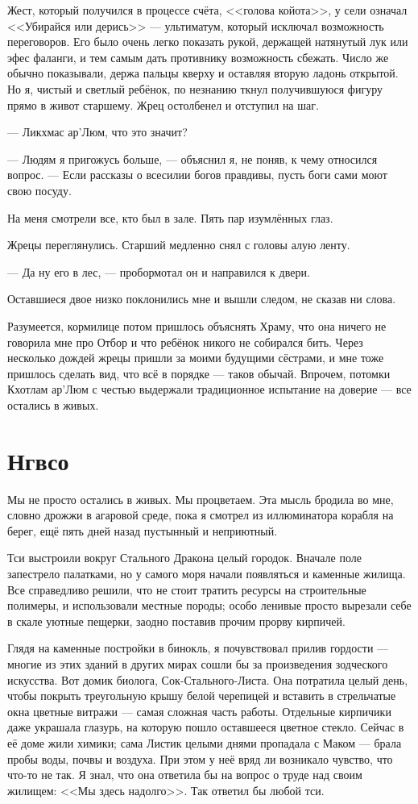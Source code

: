 Жест, который получился в процессе счёта, <<голова койота>>, у сели означал <<Убирайся или дерись>> --- ультиматум, который исключал возможность переговоров.
Его было очень легко показать рукой, держащей натянутый лук или эфес фаланги, и тем самым дать противнику возможность сбежать.
Число же обычно показывали, держа пальцы кверху и оставляя вторую ладонь открытой.
Но я, чистый и светлый ребёнок, по незнанию ткнул получившуюся фигуру прямо в живот старшему.
Жрец остолбенел и отступил на шаг.

--- Ликхмас ар’Люм, что это значит?

--- Людям я пригожусь больше, --- объяснил я, не поняв, к чему относился вопрос.
--- Если рассказы о всесилии богов правдивы, пусть боги сами моют свою посуду.

На меня смотрели все, кто был в зале.
Пять пар изумлённых глаз.

Жрецы переглянулись.
Старший медленно снял с головы алую ленту.

--- Да ну его в лес, --- пробормотал он и направился к двери.

Оставшиеся двое низко поклонились мне и вышли следом, не сказав ни слова.

Разумеется, кормилице потом пришлось объяснять Храму, что она ничего не говорила мне про Отбор и что ребёнок никого не собирался бить.
Через несколько дождей жрецы пришли за моими будущими сёстрами, и мне тоже пришлось сделать вид, что всё в порядке --- таков обычай.
Впрочем, потомки Кхотлам ар'Люм с честью выдержали традиционное испытание на доверие --- все остались в живых.

\section{Нгвсо}

Мы не просто остались в живых.
Мы процветаем.
Эта мысль бродила во мне, словно дрожжи в агаровой среде, пока я смотрел из иллюминатора корабля на берег, ещё пять дней назад пустынный и неприютный.

Тси выстроили вокруг Стального Дракона целый городок.
Вначале поле запестрело палатками, но у самого моря начали появляться и каменные жилища.
Все справедливо решили, что не стоит тратить ресурсы на строительные полимеры, и использовали местные породы;
особо ленивые просто вырезали себе в скале уютные пещерки, заодно поставив прочим прорву кирпичей.

Глядя на каменные постройки в бинокль, я почувствовал прилив гордости --- многие из этих зданий в других мирах сошли бы за произведения зодческого искусства.
Вот домик биолога, Сок-Стального-Листа.
Она потратила целый день, чтобы покрыть треугольную крышу белой черепицей и вставить в стрельчатые окна цветные витражи --- самая сложная часть работы.
Отдельные кирпичики даже украшала глазурь, на которую пошло оставшееся цветное стекло.
Сейчас в её доме жили химики;
сама Листик целыми днями пропадала с Маком --- брала пробы воды, почвы и воздуха.
При этом у неё вряд ли возникало чувство, что что-то не так.
Я знал, что она ответила бы на вопрос о труде над своим жилищем: <<Мы здесь надолго>>.
Так ответил бы любой тси.

